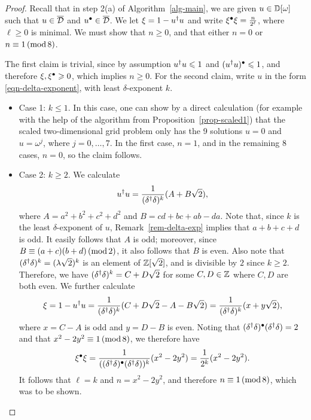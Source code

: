 \begin{proof}
  Recall that in step 2(a) of Algorithm~\ref{alg-main}, we are given
  $u\in{\mathbb{D}}[\omega]$ such that $u\in\overline {\cal D}$ and $u^{\bullet}\in\overline {\cal D}$. We let
  $\xi=1-u^{\dagger} u$ and write $\xi^{\bullet}\xi=\frac{n}{2^\ell}$, where
  $\ell\geq 0$ is minimal. We must show that $n\geq 0$, and that either
  $n=0$ or $n\equiv 1\,(\mathop{{\rm mod}}8)$.

  The first claim is trivial, since by assumption $u^{\dagger} u\leqslant 1$ and
  $(u^{\dagger} u)^{\bullet}\leqslant 1$, and therefore $\xi,\xi^{\bullet}\geqslant 0$, which
  implies $n\geq 0$. For the second claim, write $u$ in the form
  {\eqref{eqn-delta-exponent}}, with least $\delta$-exponent $k$.
  
  \begin{itemize}
  \item Case 1: $k\leq 1$. In this case, one can show by a direct
    calculation (for example with the help of the algorithm from
    Proposition~\ref{prop-scaled1}) that the scaled two-dimensional
    grid problem only has the 9 solutions $u=0$ and $u=\omega^j$,
    where $j=0,\ldots,7$. In the first case, $n=1$, and in the
    remaining 8 cases, $n=0$, so the claim follows.
  \item Case 2: $k\geq 2$. We calculate
    \[ u^{\dagger} u = \frac{1}{(\delta^{\dagger}\delta)^k}(A+B\sqrt 2),
    \] 
    where $A=a^2+b^2+c^2+d^2$ and $B=cd+bc+ab-da$. Note that, since
    $k$ is the least $\delta$-exponent of $u$,
    Remark~\ref{rem-delta-exp} implies that $a+b+c+d$ is odd. It
    easily follows that $A$ is odd; moreover, since $B\equiv
    (a+c)(b+d)\,(\mathop{{\rm mod}}2)$, it also follows that $B$ is even.  Also note
    that $(\delta^{\dagger}\delta)^k = (\lambda\sqrt2)^k$ is an element
    of $\mathbb{Z}[\sqrt2]$, and is divisible by $2$ since $k\geq
    2$. Therefore, we have $(\delta^{\dagger}\delta)^k = C+D\sqrt2$ for
    some $C,D\in\mathbb{Z}$ where $C,D$ are both even. We further calculate
    \[ \xi = 1-u^{\dagger} u =
    \frac{1}{(\delta^{\dagger}\delta)^k}(C+D\sqrt2 - A -
    B\sqrt 2)
    = \frac{1}{(\delta^{\dagger}\delta)^k}(x+y\sqrt2),
    \]
    where $x=C-A$ is odd and $y=D-B$ is even. Noting that
    $(\delta^{\dagger}\delta)^{\bullet}(\delta^{\dagger}\delta)=2$ and that
    $x^2-2y^2\equiv 1\,(\mathop{{\rm mod}}8)$, we therefore have
    \[ \xi^{\bullet}\xi = 
    \frac{1}{((\delta^{\dagger}\delta)^{\bullet}(\delta^{\dagger}\delta))^k}(x^2-2y^2)
    = \frac{1}{2^k}(x^2-2y^2).
    \]
    It follows that $\ell=k$ and $n=x^2-2y^2$, and therefore $n\equiv 1\,(\mathop{{\rm mod}}8)$,
    which was to be shown.\qedhere
  \end{itemize}
\end{proof}
